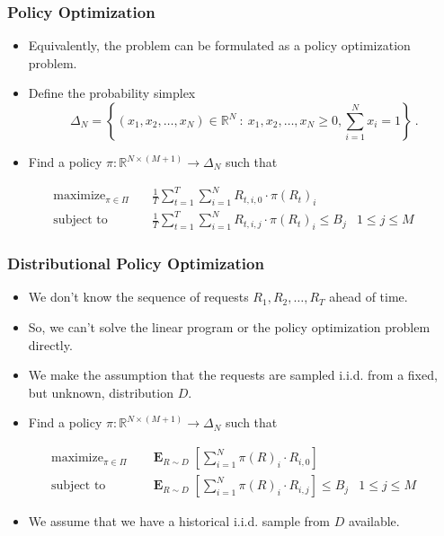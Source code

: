 \documentclass[usenames,dvipsnames]{beamer}
\DeclareMathOperator*{\Exp}{\mathbf{E}}
\DeclareMathOperator*{\maximize}{maximize}
\DeclareMathOperator*{\subjectto}{subject\ to}
\newcommand{\R}{\mathbb{R}}
\begin{document}
\begin{frame}
\frametitle{Policy Optimization}

\begin{itemize}
\item Equivalently, the problem can be formulated as a policy optimization problem.
\item Define the probability simplex
$$
\Delta_N = \left\{ (x_1, x_2, \dots, x_N) \in \R^N ~:~ x_1, x_2, \dots, x_N \ge 0, \sum_{i=1}^N x_i = 1  \right\} \: .
$$
\item Find a policy $\pi: \R^{N \times (M+1)} \to \Delta_N$ such that
\end{itemize}

\begin{align*}
\maximize_{\pi \in \Pi} \quad & \frac{1}{T} \sum_{t=1}^T \sum_{i=1}^N R_{t,i,0} \cdot \pi(R_t)_i \\
\subjectto \quad & \frac{1}{T} \sum_{t=1}^T \sum_{i=1}^N R_{t,i,j} \cdot \pi(R_t)_i \le B_j & 1 \le j \le M
\end{align*}

\end{frame}

\begin{frame}
\frametitle{Distributional Policy Optimization}

\begin{itemize}
\item We don't know the sequence of requests $R_1, R_2, \dots, R_T$ ahead of time.
\item So, we can't solve the linear program or the policy optimization problem directly.
\item We make the assumption that the requests are sampled i.i.d. from a fixed, but unknown, distribution $D$.
\item Find a policy $\pi: \R^{N \times (M+1)} \to \Delta_N$ such that
\end{itemize}

\begin{align*}
\maximize_{\pi \in \Pi} \quad & \Exp_{R \sim D} \left[ \sum_{i=1}^N \pi(R)_i \cdot R_{i,0} \right] \\
\subjectto \quad & \Exp_{R \sim D} \left[ \sum_{i=1}^N \pi(R)_i \cdot R_{i,j} \right] \le B_j & 1 \le j \le M
\end{align*}

\begin{itemize}
\item We assume that we have a historical i.i.d. sample from $D$ available.
\end{itemize}

\end{frame}
\end{document}
